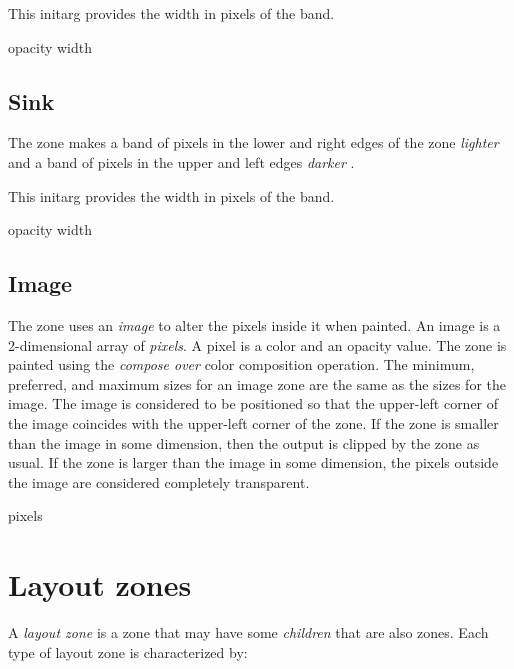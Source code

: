 
This initarg provides the width in pixels of the band.

 {opacity width}

\subsection{Sink}

The  zone makes a band of pixels in the lower and right
edges of the zone \emph{lighter}  and
a band of pixels in the upper and left edges \emph{darker}
. 




This initarg provides the width in pixels of the band.

 {opacity width}

\subsection{Image}
\label{sec-zones-graphic-image}

The  zone uses an \emph{image} to alter the pixels inside
it when painted.  An image is a 2-dimensional array of \emph{pixels}.
A pixel is a color and an opacity value.  The zone is painted using
the \emph{compose over} color composition operation.  The minimum,
preferred, and maximum sizes for an image zone are the same as the
sizes for the image.  The image is considered to be positioned so that
the upper-left corner of the image coincides with the upper-left
corner of the zone.  If the zone is smaller than the image in some
dimension, then the output is clipped by the zone as usual.  If the
zone is larger than the image in some dimension, the pixels outside
the image are considered completely transparent.


 {pixels}

\section{Layout zones}
\label{sec-zones-layout}

A \emph{layout zone} is a zone that may have some \emph{children} that
are also zones.  Each type of layout zone is characterized by:

